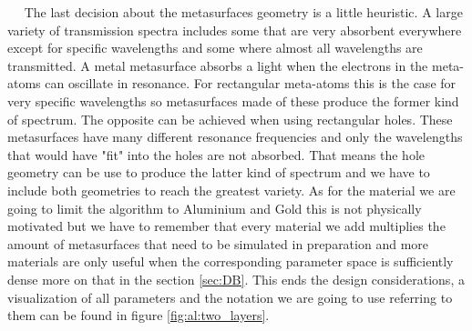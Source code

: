 $\quad$ The last decision about the metasurfaces geometry is a little heuristic. A large variety of transmission spectra includes some that are very absorbent everywhere except for specific wavelengths and some where almost all wavelengths are transmitted. A metal metasurface absorbs a light when the electrons in the meta-atoms can oscillate in resonance. For rectangular meta-atoms this is the case for very specific wavelengths so metasurfaces made of these produce the former kind of spectrum. The opposite can be achieved when using rectangular holes. These metasurfaces have many different resonance frequencies and only the wavelengths that would have "fit" into the holes are not absorbed. That means the hole geometry can be use to produce the latter kind of spectrum and we have to include both geometries to reach the greatest variety. As for the material we are going to limit the algorithm to Aluminium and Gold this is not physically motivated but we have to remember that every material we add multiplies the amount of metasurfaces that need to be simulated in preparation and more materials are only useful when the corresponding parameter space is sufficiently dense more on that in the section \ref{sec:DB}.
This ends the design considerations, a visualization of all parameters and the notation we are going to use referring to them can be found in figure \ref{fig:al:two_layers}.
\\

\newpage
